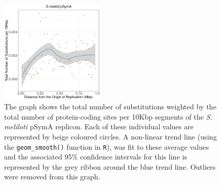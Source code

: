 \documentclass[11pt]{article}
\newcommand{\smel}{\textit{S.\,meliloti}\xspace}
\newcommand{\pa}{pSymA\xspace}
\providecommand{\DIFaddbegin}{} %
\providecommand{\DIFdelbegin}{} %
\providecommand{\DIFdelend}{} %
\providecommand{\DIFaddbeginFL}{} %
\providecommand{\DIFaddendFL}{} %
\providecommand{\DIFdelbeginFL}{} %
\providecommand{\DIFdelendFL}{} %
\begin{document}
\DIFdelbegin %
\DIFdelend \DIFaddbegin \begin{figure}[H]
	\DIFaddendFL \begin{center}
		\DIFdelbeginFL %
\DIFdelendFL \DIFaddbeginFL \includegraphics[width=0.44\textwidth]{./figs/pSymA_10KB_weighted_subs_nonpar_22Sep20.pdf}
		\DIFaddendFL \caption{\label{fig:pSymA_nonpar}The graph shows the total number of substitutions weighted by the total number of protein-coding sites per 10Kbp segments of the \smel \pa replicon. Each of these individual values are represented by beige coloured circles. A non-linear trend line (using the \texttt{geom\_smooth()} function in \texttt{R}), was fit to these average values and the associated 95\% confidence intervals for this line is represented by the grey ribbon around the blue trend line. Outliers were removed from this graph.}
	\end{center}
\end{figure}
\end{document}
